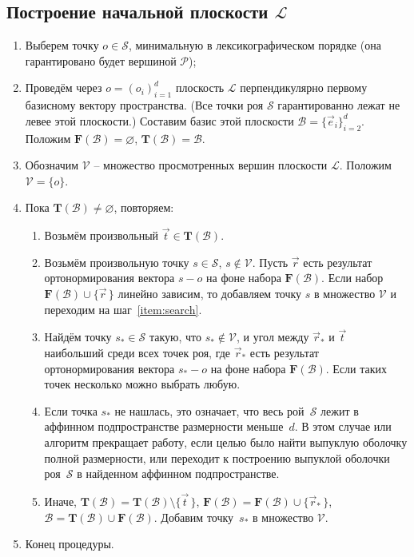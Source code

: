 \documentclass[a4paper,12pt]{article}
\newcommand{\Swarm}{\mathcal{S}} %
\newcommand{\Polyhedron}{\mathcal{P}} %
\newcommand{\Basis}{\mathcal{B}} %
\newcommand{\Viewed}{\mathcal{V}} %
\newcommand{\origin}{o} %
\newcommand{\TempVec}{\mathbf{T}(\Basis)} %
\newcommand{\FinalVec}{\mathbf{F}(\Basis)} %
\newcommand{\Plane}{\mathcal{L}} %
\begin{document}
  \subsection{Построение начальной плоскости $\Plane$}
    \begin{enumerate}
      \item Выберем точку $\origin \in \Swarm$, минимальную в лексикографическом порядке (она гарантировано будет вершиной $\Polyhedron$);

      \item Проведём через $\origin=(o_i)_{i = 1}^{d}$ плоскость $\Plane$ перпендикулярно первому базисному вектору пространства. (Все точки роя $\Swarm$ гарантированно лежат не левее этой плоскости.) Составим базис этой плоскости $\Basis = \{ \vec e_i \}_{i=2}^d$. Положим $\FinalVec = \varnothing$, $\TempVec = \Basis$.
      \item Обозначим $\Viewed$ -- множество просмотренных вершин плоскости $\Plane$. Положим $\Viewed = \{ o \}$.
      \item Пока $\TempVec \neq \varnothing$, повторяем:
      \begin{enumerate}
        \item Возьмём произвольный $\vec t \in \TempVec$.
        \item Возьмём произвольную точку $s \in \Swarm$, $s \notin \Viewed$. Пусть $\vec r$ есть результат ортонормирования вектора $s - o$ на фоне набора $\FinalVec$. Если набор $\FinalVec \cup \{ \vec r \, \}$ линейно зависим, то добавляем точку $s$ в множество $\Viewed$ и переходим на шаг~\ref{item:search}.
        \label{item:search}
        \item Найдём точку $s_* \in \Swarm$ такую, что $s_* \notin \Viewed$, и угол между $\vec r_*$ и $\vec t$ наибольший среди всех точек роя, где $\vec r_*$ есть результат ортонормирования вектора $s_* - o$ на фоне набора $\FinalVec$. Если таких точек несколько можно выбрать любую.
        \item Если точка $s_*$ не нашлась, это означает, что весь рой~$\Swarm$ лежит в аффинном подпространстве размерности меньше~$d$. В этом случае или алгоритм прекращает работу, если целью было найти выпуклую оболочку полной размерности, или переходит к построению выпуклой оболочки роя~$\Swarm$ в найденном аффинном подпространстве.
        \item Иначе, $\TempVec = \TempVec \setminus \{ \vec t \, \}$, $\FinalVec = \FinalVec \cup \{ \vec r_* \, \}$, $\Basis = \TempVec \cup \FinalVec$. Добавим точку~$s_*$ в множество $\Viewed$.
      \end{enumerate}
      \item Конец процедуры.
    \end{enumerate}
\end{document}

